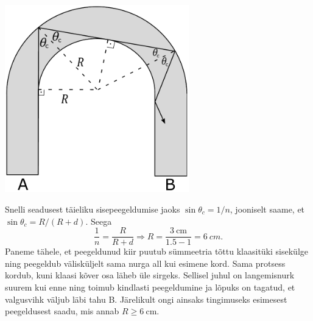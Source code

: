 \begin{center}
	\includegraphics[width=0.6\textwidth]{2020-lahg-03-yl.pdf} 
\end{center}

Snelli seadusest täieliku sisepeegeldumise jaoks
$\sin\theta_c = {1}/{n}$, jooniselt saame, et $\sin\theta_c=R/(R+d)$. Seega
$$\frac{1}{n}=\frac{R}{R+d}\Rightarrow R = \frac{\SI{3}{\cm}}{1.5-1}=\SI{6}{cm}.$$
Paneme tähele, et peegeldunud kiir puutub sümmeetria tõttu klaasitüki sisekülge ning peegeldub välisküljelt sama nurga all kui esimene kord. Sama protsess kordub, kuni klaasi kõver osa läheb üle sirgeks. Sellisel juhul on langemisnurk suurem kui enne ning toimub kindlasti peegeldumine ja lõpuks on tagatud, et valgusvihk väljub läbi tahu B. Järelikult ongi ainsaks tingimuseks esimesest peegeldusest saadu, mis annab $R\geq\SI{6}{\cm}$.
\probend
